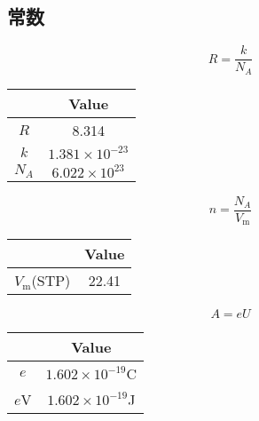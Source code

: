 \documentclass[10pt]{article}
\numberwithin{equation}{section}
\begin{document}
\begin{multicols}{3}
\begin{CJK}{UTF8}{gbsn}
\section{常数}
\begin{equation}
  R=\frac{k}{N_A}
\end{equation}
\begin{center}
\begin{tabular}{cc}
  \hline
   & Value \\
  \hline
  $R$ & 8.314\\
  $k$ & $1.381\times 10^{-23}$\\
  $N_A$ & $6.022\times 10^{23}$ \\
  \hline
\end{tabular}
\end{center}
\begin{equation}
  n=\frac{N_A}{V_{\textrm{m}}}
\end{equation}
\begin{center}
\begin{tabular}{cc}
  \hline
   & Value \\
  \hline
  $V_{\textrm{m}}$(STP) & 22.41\\
  \hline
\end{tabular}
\end{center}
\begin{equation}
  A=eU
\end{equation}
\begin{center}
\begin{tabular}{cc}
  \hline
   & Value \\
  \hline
  $e$ & $1.602\times 10^{-19}$C\\
  $e$V & $1.602\times 10^{-19}$J\\
  \hline
\end{tabular}
\end{center}
\end{CJK}
\end{multicols}
\end{document}
